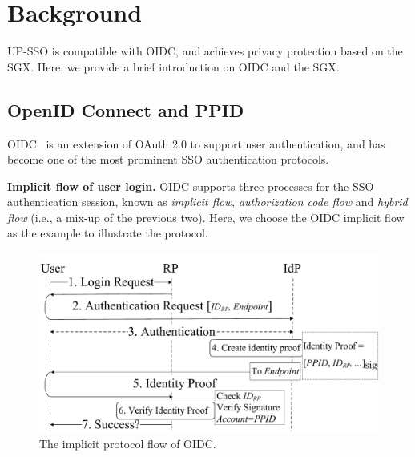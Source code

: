 \section{Background}
\label{sec:background}
UP-SSO is compatible with OIDC, and achieves privacy protection based on the SGX.
Here, we provide a brief introduction on OIDC and the SGX.
\subsection{OpenID Connect and PPID}
OIDC~\cite{OpenIDConnect} is an extension of OAuth 2.0 to support user authentication, and has become one of the most prominent SSO authentication protocols. 

\vspace{1mm}\noindent\textbf{Implicit flow of user login.}
OIDC supports three processes for the SSO authentication session, known as {\em implicit flow}, {\em authorization code flow} and {\em hybrid flow} (i.e., a mix-up of the previous two). Here, we choose the OIDC implicit flow as the example to illustrate the protocol. 

\begin{figure}[t]
  \centering
  \includegraphics[width=\linewidth]{fig/OIDC1.pdf}
  \vspace{-5mm}
  \caption{The implicit protocol flow of OIDC.}
  \label{fig:OpenID}
  \vspace{-6mm}
\end{figure}

